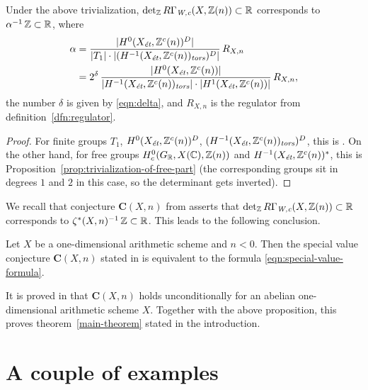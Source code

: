 \documentclass[draft]{article}
\numberwithin{equation}{section}
\begin{document}
\begin{proposition}
  Under the above trivialization, $\det_\ZZ R\Gamma_\Wc (X, \ZZ(n)) \subset \RR$
  corresponds to $\alpha^{-1}\,\ZZ \subset \RR$, where
  \begin{align*}
    \alpha & = \frac{|H^0 (X_\et, \ZZ^c(n))^D|}{|T_1| \cdot |(H^{-1} (X_\et, \ZZ^c(n))_\tors)^D|}\,R_{X,n} \\
           & = 2^\delta\,\frac{|H^0 (X_\et, \ZZ^c (n))|}{|H^{-1} (X_\et, \ZZ^c(n))_\tors|\cdot |H^1 (X_\et, \ZZ^c(n))|}\,R_{X,n},
  \end{align*}
  the number $\delta$ is given by \eqref{eqn:delta}, and $R_{X,n}$ is
  the regulator from definition~\ref{dfn:regulator}.

  \begin{proof}
    For finite groups $T_1$, $H^0 (X_\et, \ZZ^c(n))^D$,
    $(H^{-1} (X_\et, \ZZ^c(n))_\tors)^D$, this is
    \cite[Lemma~A.6]{Beshenov-Weil-etale-2}. On the other hand, for free groups
    $H^0_c (G_\RR, X(\CC), \ZZ(n))$ and $H^{-1} (X_\et, \ZZ^c (n))^*$,
    this is Proposition~\ref{prop:trivialization-of-free-part} (the
    corresponding groups sit in degrees $1$ and $2$ in this case, so the
    determinant gets inverted).
  \end{proof}
\end{proposition}

We recall that conjecture $\mathbf{C} (X,n)$ from
\cite[\S 4]{Beshenov-Weil-etale-2} asserts that
$\det_\ZZ R\Gamma_\Wc (X, \ZZ(n)) \subset \RR$ corresponds to
$\zeta^* (X,n)^{-1}\,\ZZ \subset \RR$. This leads to the following conclusion.

\begin{proposition}
  Let $X$ be a one-dimensional arithmetic scheme and $n < 0$. Then the special
  value conjecture $\mathbf{C} (X,n)$ stated in \cite{Beshenov-Weil-etale-2} is
  equivalent to the formula \eqref{eqn:special-value-formula}.
\end{proposition}

It is proved in \cite[\S 7]{Beshenov-Weil-etale-2} that $\mathbf{C} (X,n)$ holds
unconditionally for an abelian one-dimensional arithmetic scheme $X$. Together
with the above proposition, this proves theorem~\ref{main-theorem} stated in the
introduction.


\section{A couple of examples}
\label{sec:examples}
\end{document}

